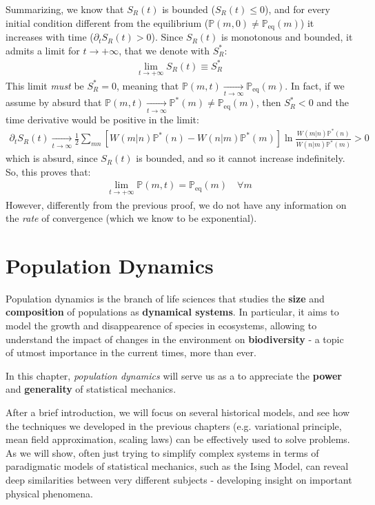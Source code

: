 \documentclass[../../main.tex]{subfiles}
\begin{document}
Summarizing, we know that $S_R(t)$ is bounded ($S_R(t) \leq 0$), and for every initial condition different from the equilibrium ($\mathbb{P}(m,0) \neq \mathbb{P}_{\mathrm{eq}}(m)$) it increases with time ($\partial_t S_R(t) > 0$). Since $S_R(t)$ is monotonous and bounded, it admits a limit for $t \to +\infty$, that we denote with $S_R^*$:
\begin{align*}
    \lim_{t \to +\infty} S_R(t) \equiv S_R^*
\end{align*}
This limit \textit{must} be $S_R^* = 0$, meaning that $\mathbb{P}(m,t)  \xrightarrow[t \to \infty]{}  \mathbb{P}_{\mathrm{eq}}(m)$. In fact, if we assume by absurd that $\mathbb{P}(m,t)  \xrightarrow[t \to \infty]{}   \mathbb{P}^*(m) \neq \mathbb{P}_{\mathrm{eq}}(m)$, then $S_R^* < 0$ and the time derivative would be positive in the limit:
\begin{align*}
    \partial_t S_R(t)  \xrightarrow[t \to \infty]{}  \frac{1}{2} \sum_{mn} [W(m|n) \mathbb{P}^*(n) - W(n|m)\mathbb{P}^*(m)] \ln \frac{W(m|n)\mathbb{P}^*(n)}{W(n|m)\mathbb{P}^*(m)} > 0
\end{align*}
which is absurd, since $S_R(t)$ is bounded, and so it cannot increase indefinitely. So, this proves that:
\begin{align*}
    \lim_{t \to +\infty} \mathbb{P}(m,t) = \mathbb{P}_{\mathrm{eq}}(m) \quad \forall m
\end{align*}
However, differently from the previous proof, we do not have any information on the \textit{rate} of convergence (which we know to be exponential).

\chapter{Population Dynamics}
Population dynamics is the branch of life sciences that studies the \textbf{size} and \textbf{composition} of populations as \textbf{dynamical systems}. In particular, it aims to model the growth and disappearence of species in ecosystems, allowing to understand the impact of changes in the environment on \textbf{biodiversity} - a topic of utmost importance in the current times, more than ever.

\medskip

In this chapter, \textit{population dynamics} will serve us as a  to appreciate the \textbf{power} and \textbf{generality} of statistical mechanics. 

\medskip

After a brief introduction, we will focus on several historical models, and see how the techniques we developed in the previous chapters (e.g. variational principle, mean field approximation, scaling laws) can be effectively used to solve problems. As we will show, often just trying to simplify complex systems in terms of paradigmatic models of statistical mechanics, such as the Ising Model, can reveal deep similarities between very different subjects - developing insight on important physical phenomena.
\end{document}
